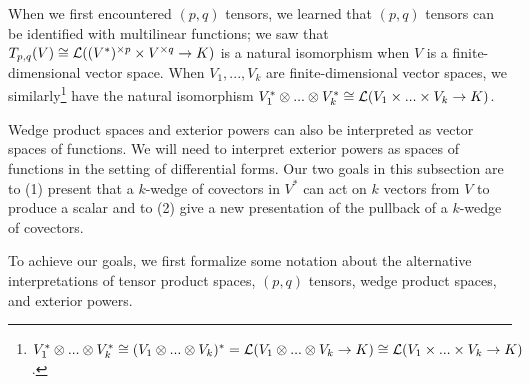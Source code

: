 

When we first encountered $(p, q)$ tensors, we learned that $(p, q)$ tensors can be identified with multilinear functions; we saw that $T_{p,q}(V) \cong \mathcal{L}((V^*)^{\times p} \times V^{\times q} \rightarrow K)$ is a natural isomorphism when $V$ is a finite-dimensional vector space. When $V_1, ..., V_k$ are finite-dimensional vector spaces, we similarly\footnote{$V_1^* \otimes ... \otimes V_k^* \cong (V_1 \otimes ... \otimes V_k)^* = \mathcal{L}(V_1 \otimes ... \otimes V_k \rightarrow K) \cong \mathcal{L}(V_1 \times ... \times V_k \rightarrow K)$.} have the natural isomorphism ${V_1^* \otimes ... \otimes V_k^* \cong \mathcal{L}(V_1 \times ... \times V_k \rightarrow K)}$.

Wedge product spaces and exterior powers can also be interpreted as vector spaces of functions. We will need to interpret exterior powers as spaces of functions in the setting of differential forms. Our two goals in this subsection are to (1) present that a $k$-wedge of covectors in $V^*$ can act on $k$ vectors from $V$ to produce a scalar and to (2) give a new presentation of the pullback of a $k$-wedge of covectors.

To achieve our goals, we first formalize some notation about the alternative interpretations of tensor product spaces, $(p, q)$ tensors, wedge product spaces, and exterior powers.


